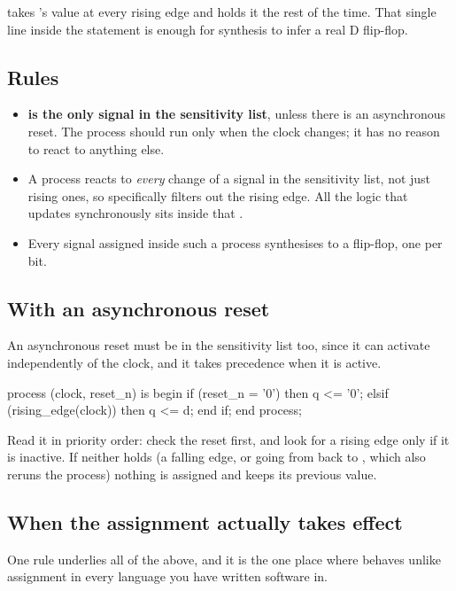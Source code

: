  takes 's value at every rising edge and holds it the rest of the time. That single
line inside the  statement is enough for synthesis to infer a real D flip-flop.

\subsection*{Rules}
\begin{itemize}
  \item \textbf{ is the only signal in the sensitivity list}, unless there is an
    asynchronous reset. The process should run only when the clock changes; it has no reason to
    react to anything else.
  \item A process reacts to \emph{every} change of a signal in the sensitivity list, not just
    rising ones, so  specifically filters out the rising edge. All the logic
    that updates synchronously sits inside that .
  \item Every signal assigned inside such a process synthesises to a flip-flop, one per bit.
\end{itemize}

\subsection*{With an asynchronous reset}
An asynchronous reset must be in the sensitivity list too, since it can activate independently of
the clock, and it takes precedence when it is active.

\begin{vhdlcode}
process (clock, reset_n) is
begin
    if (reset_n = '0') then
        q <= '0';
    elsif (rising_edge(clock)) then
        q <= d;
    end if;
end process;
\end{vhdlcode}

Read it in priority order: check the reset first, and look for a rising edge only if it is
inactive. If neither holds (a falling edge, or  going from  back to ,
which also reruns the process) nothing is assigned and  keeps its previous value.

\subsection*{When the assignment actually takes effect}
One rule underlies all of the above, and it is the one place where \code{<=} behaves unlike
assignment in every language you have written software in.

